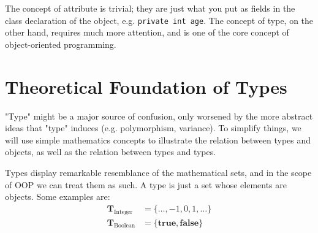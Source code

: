 \documentclass[12pt]{article}
\theoremstyle{definition}
\newcommand{\code}[1]{\colorbox{codegray}{\texttt{#1}}}
\newcommand{\ttype}[1]{\textbf{T}_\text{#1}}
\begin{document}
	The concept of attribute is trivial; they are just what you put as fields in the class declaration of the object, e.g. \code{private int age}. The concept of type, on the other hand, requires much more attention, and is one of the core concept of object-oriented programming.
	
	\section{Theoretical Foundation of Types}
	
	"Type" might be a major source of confusion, only worsened by the more abstract ideas that "type" induces (e.g. polymorphism, variance). To simplify things, we will use simple mathematics concepts to illustrate the relation between types and objects, as well as the relation between types and types.
	
	Types display remarkable resemblance of the mathematical sets, and in the scope of OOP we can treat them as such. A type is just a set whose elements are objects. Some examples are:
	\begin{align*}
		\ttype{Integer} &= \{\dots, -1, 0, 1, \dots\} \\
		\ttype{Boolean} &= \{\textbf{true}, \textbf{false}\}
	\end{align*}
	
\end{document}
